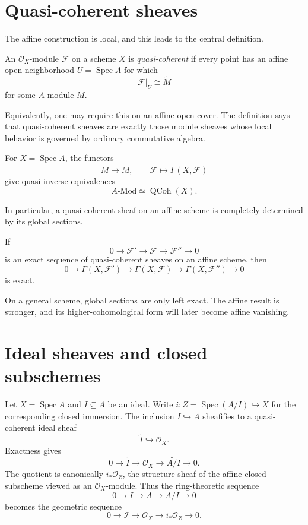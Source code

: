\section{Quasi-coherent sheaves}
The affine construction is local, and this leads to the central definition.

\begin{definition}
An $\mathcal O_X$-module $\mathcal F$ on a scheme $X$ is \emph{quasi-coherent} if every point has an affine open neighborhood $U=\operatorname{Spec}A$ for which
\[
\mathcal F|_U\cong\widetilde M
\]
for some $A$-module $M$.
\end{definition}

Equivalently, one may require this on an affine open cover.  The definition says that quasi-coherent sheaves are exactly those module sheaves whose local behavior is governed by ordinary commutative algebra.

\begin{theorem}
For $X=\operatorname{Spec}A$, the functors
\[
M\longmapsto\widetilde M,
\qquad
\mathcal F\longmapsto\Gamma(X,\mathcal F)
\]
give quasi-inverse equivalences
\[
\boxed{A\text{-}\mathrm{Mod}\simeq\operatorname{QCoh}(X).}
\]
\end{theorem}

In particular, a quasi-coherent sheaf on an affine scheme is completely determined by its global sections.

\begin{corollary}
If
\[
0\to\mathcal F'\to\mathcal F\to\mathcal F''\to0
\]
is an exact sequence of quasi-coherent sheaves on an affine scheme, then
\[
0\to\Gamma(X,\mathcal F')\to\Gamma(X,\mathcal F)\to\Gamma(X,\mathcal F'')\to0
\]
is exact.
\end{corollary}

On a general scheme, global sections are only left exact.  The affine result is stronger, and its higher-cohomological form will later become affine vanishing.



\section{Ideal sheaves and closed subschemes}
Let $X=\operatorname{Spec}A$ and $I\subseteq A$ be an ideal.  Write $i:Z=\operatorname{Spec}(A/I)\hookrightarrow X$ for the corresponding closed immersion.  The inclusion $I\hookrightarrow A$ sheafifies to a quasi-coherent ideal sheaf
\[
\widetilde I\hookrightarrow\mathcal O_X.
\]
Exactness gives
\[
0\to\widetilde I\to\mathcal O_X\to\widetilde{A/I}\to0.
\]
The quotient is canonically $i_*\mathcal O_Z$, the structure sheaf of the affine closed subscheme viewed as an $\mathcal O_X$-module.  Thus the ring-theoretic sequence
\[
0\to I\to A\to A/I\to0
\]
becomes the geometric sequence
\[
\boxed{0\to\mathcal I\to\mathcal O_X\to i_*\mathcal O_Z\to0.}
\]

